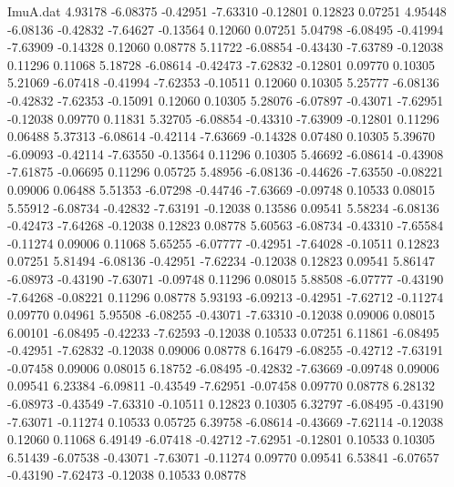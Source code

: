 \begin{filecontents}{ImuA.dat}
   4.93178   -6.08375   -0.42951   -7.63310   -0.12801    0.12823    0.07251
   4.95448   -6.08136   -0.42832   -7.64627   -0.13564    0.12060    0.07251
   5.04798   -6.08495   -0.41994   -7.63909   -0.14328    0.12060    0.08778
   5.11722   -6.08854   -0.43430   -7.63789   -0.12038    0.11296    0.11068
   5.18728   -6.08614   -0.42473   -7.62832   -0.12801    0.09770    0.10305
   5.21069   -6.07418   -0.41994   -7.62353   -0.10511    0.12060    0.10305
   5.25777   -6.08136   -0.42832   -7.62353   -0.15091    0.12060    0.10305
   5.28076   -6.07897   -0.43071   -7.62951   -0.12038    0.09770    0.11831
   5.32705   -6.08854   -0.43310   -7.63909   -0.12801    0.11296    0.06488
   5.37313   -6.08614   -0.42114   -7.63669   -0.14328    0.07480    0.10305
   5.39670   -6.09093   -0.42114   -7.63550   -0.13564    0.11296    0.10305
   5.46692   -6.08614   -0.43908   -7.61875   -0.06695    0.11296    0.05725
   5.48956   -6.08136   -0.44626   -7.63550   -0.08221    0.09006    0.06488
   5.51353   -6.07298   -0.44746   -7.63669   -0.09748    0.10533    0.08015
   5.55912   -6.08734   -0.42832   -7.63191   -0.12038    0.13586    0.09541
   5.58234   -6.08136   -0.42473   -7.64268   -0.12038    0.12823    0.08778
   5.60563   -6.08734   -0.43310   -7.65584   -0.11274    0.09006    0.11068
   5.65255   -6.07777   -0.42951   -7.64028   -0.10511    0.12823    0.07251
   5.81494   -6.08136   -0.42951   -7.62234   -0.12038    0.12823    0.09541
   5.86147   -6.08973   -0.43190   -7.63071   -0.09748    0.11296    0.08015
   5.88508   -6.07777   -0.43190   -7.64268   -0.08221    0.11296    0.08778
   5.93193   -6.09213   -0.42951   -7.62712   -0.11274    0.09770    0.04961
   5.95508   -6.08255   -0.43071   -7.63310   -0.12038    0.09006    0.08015
   6.00101   -6.08495   -0.42233   -7.62593   -0.12038    0.10533    0.07251
   6.11861   -6.08495   -0.42951   -7.62832   -0.12038    0.09006    0.08778
   6.16479   -6.08255   -0.42712   -7.63191   -0.07458    0.09006    0.08015
   6.18752   -6.08495   -0.42832   -7.63669   -0.09748    0.09006    0.09541
   6.23384   -6.09811   -0.43549   -7.62951   -0.07458    0.09770    0.08778
   6.28132   -6.08973   -0.43549   -7.63310   -0.10511    0.12823    0.10305
   6.32797   -6.08495   -0.43190   -7.63071   -0.11274    0.10533    0.05725
   6.39758   -6.08614   -0.43669   -7.62114   -0.12038    0.12060    0.11068
   6.49149   -6.07418   -0.42712   -7.62951   -0.12801    0.10533    0.10305
   6.51439   -6.07538   -0.43071   -7.63071   -0.11274    0.09770    0.09541
   6.53841   -6.07657   -0.43190   -7.62473   -0.12038    0.10533    0.08778

\end{filecontents}
